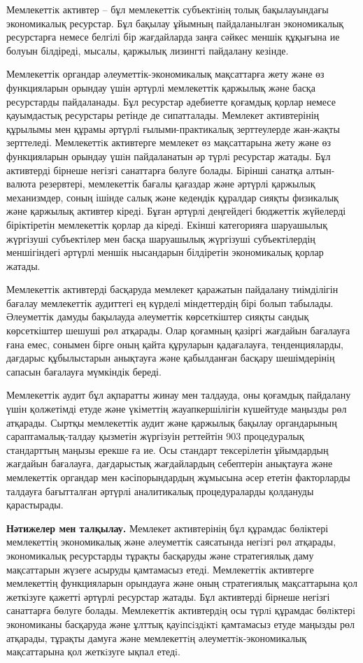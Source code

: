 \begin{multicols}{2}
Мемлекеттiк активтер -- бұл мемлекеттiк субъектiнiң толық бақылауындағы
экономикалық ресурстар. Бұл бақылау ұйымның пайдаланылған экономикалық
ресурстарға немесе белгілі бір жағдайларда заңға сәйкес меншік құқығына
ие болуын білдіреді, мысалы, қаржылық лизингті пайдалану кезінде.

Мемлекеттік органдар әлеуметтік-экономикалық мақсаттарға жету және өз
функцияларын орындау үшін әртүрлі мемлекеттік қаржылық және басқа
ресурстарды пайдаланады. Бұл ресурстар әдебиетте қоғамдық қорлар немесе
қауымдастық ресурстары ретінде де сипатталады. Мемлекет активтерінің
құрылымы мен құрамы әртүрлі ғылыми-практикалық зерттеулерде жан-жақты
зерттеледі. Мемлекеттiк активтерге мемлекет өз мақсаттарына жету және өз
функцияларын орындау үшiн пайдаланатын әр түрлi ресурстар жатады. Бұл
активтерді бірнеше негізгі санаттарға бөлуге болады. Бірінші санатқа
алтын-валюта резервтері, мемлекеттік бағалы қағаздар және әртүрлі
қаржылық механизмдер, соның ішінде салық және кедендік құралдар сияқты
физикалық және қаржылық активтер кіреді. Бұған әртүрлі деңгейдегі
бюджеттік жүйелерді біріктіретін мемлекеттік қорлар да кіреді. Екінші
категорияға шаруашылық жүргізуші субъектілер мен басқа шаруашылық
жүргізуші субъектілердің меншігіндегі әртүрлі меншік нысандарын
білдіретін экономикалық қорлар жатады.

Мемлекеттік активтерді басқаруда мемлекет қаражатын пайдалану
тиімділігін бағалау мемлекеттік аудиттегі ең күрделі міндеттердің бірі
болып табылады. Әлеуметтік дамуды бақылауда әлеуметтік көрсеткіштер
сияқты сандық көрсеткіштер шешуші рөл атқарады. Олар қоғамның қазіргі
жағдайын бағалауға ғана емес, сонымен бірге оның қайта құруларын
қадағалауға, тенденцияларды, дағдарыс құбылыстарын анықтауға және
қабылданған басқару шешімдерінің сапасын бағалауға мүмкіндік береді.

Мемлекеттік аудит бұл ақпаратты жинау мен талдауда, оны қоғамдық
пайдалану үшін қолжетімді етуде және үкіметтің жауапкершілігін күшейтуде
маңызды рөл атқарады. Сыртқы мемлекеттік аудит және қаржылық бақылау
органдарының сараптамалық-талдау қызметін жүргізуін реттейтін 903
процедуралық стандарттың маңызы ерекше ға ие. Осы стандарт тексерілетін
ұйымдардың жағдайын бағалауға, дағдарыстық жағдайлардың себептерін
анықтауға және мемлекеттік органдар мен кәсіпорындардың жұмысына әсер
ететін факторларды талдауға бағытталған әртүрлі аналитикалық
процедураларды қолдануды қарастырады.

{\bfseries Нәтижелер мен талқылау.} Мемлекет активтерінің бұл құрамдас
бөліктері мемлекеттің экономикалық және әлеуметтік саясатында негізгі
рөл атқарады, экономикалық ресурстарды тұрақты басқаруды және
стратегиялық даму мақсаттарын жүзеге асыруды қамтамасыз етеді.
Мемлекеттік активтерге мемлекеттің функцияларын орындауға және оның
стратегиялық мақсаттарына қол жеткізуге қажетті әртүрлі ресурстар
жатады. Бұл активтерді бірнеше негізгі санаттарға бөлуге болады.
Мемлекеттiк активтердiң осы түрлi құрамдас бөлiктерi экономиканы
басқаруда және ұлттық қауiпсiздiктi қамтамасыз етуде маңызды рөл
атқарады, тұрақты дамуға және мемлекеттiң әлеуметтiк-экономикалық
мақсаттарына қол жеткiзуге ықпал етедi.
\end{multicols}

